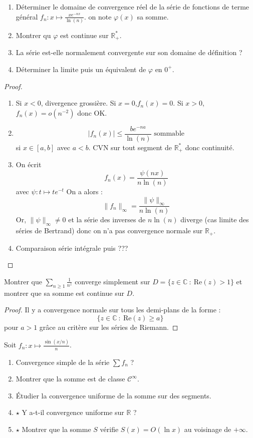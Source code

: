 \documentclass[french,a4paper]{article}
\newcommand{\R}{\mathbb{R}}
\newcommand{\C}{\mathbb{C}}
\newcommand{\st}{^*}
\theoremstyle{plain}
\theoremstyle{definition}
\theoremstyle{remark}
\begin{document}
\begin{ex}{}
	\begin{enumerate}
		\item Déterminer le domaine de convergence réel de la série de fonctions de terme général $f_n:x\mapsto\displaystyle\frac{xe^{-nx}}{\ln(n)}$. on note $\varphi(x)$ sa somme.
		\item Montrer qu $\varphi$ est continue sur $\R_+\st$.
		\item La série est-elle normalement convergente sur son domaine de définition ?
		\item Déterminer la limite puis un équivalent de $\varphi$ en $0^+$.
	\end{enumerate}
\end{ex}
\begin{proof}
	\begin{enumerate}
		\item Si $x<0$, divergence grossière. Si $x=0$,$f_n(x)=0$. Si $x>0$, $f_n(x)=o(n^{-2})$ donc OK.
		\item $$\lvert f_n(x)\rvert\leqslant \frac{be^{-na}}{\ln(n)}\text{ sommable}$$ si $x\in[a,b]$ avec $a<b$. CVN sur tout segment de $\R_+\st$ donc continuité.
		\item On écrit $$f_n(x)=\frac{\psi(nx)}{n\ln(n)}$$ avec $\psi:t\mapsto te^{-t}$ On a alors : $$\lVert f_n\rVert_\infty=\frac{\lVert\psi\rVert_\infty}{n\ln(n)}$$ Or, $\lVert\psi\rVert_\infty\ne0$ et la série des inverses de $n\ln(n)$ diverge (cas limite des séries de Bertrand) donc on n'a pas convergence normale sur $\R_+$.
		\item Comparaison série intégrale puis ???
	\end{enumerate}
\end{proof}

\begin{ex}{}
	Montrer que $\displaystyle\sum_{n\geqslant 1}\frac{1}{n^z}$ converge simplement sur $D=\{z\in\C\ : \ \text{Re}(z)>1\}$ et montrer que sa somme est continue sur $D$.
\end{ex}
\begin{proof}
	Il y a convergence normale sur tous les demi-plans de la forme : $$\{z\in\C\ : \ \text{Re}(z)\geqslant a\}$$ pour $a>1$ grâce au critère sur les séries de Riemann.
\end{proof}

\begin{ex}{}
	Soit $f_n:x\mapsto\displaystyle\frac{\sin(x/n)}{n}$.
	\begin{enumerate}
		\item Convergence simple de la série $\sum f_n$ ?
		\item Montrer que la somme est de classe $\mathcal{C}^\infty$.
		\item Étudier la convergence uniforme de la somme sur des segments.
		\item $\star$ Y a-t-il convergence uniforme sur $\R$ ?
		\item $\star$ Montrer que la somme $S$ vérifie $S(x)=O(\ln x)$ au voisinage de $+\infty$.
	\end{enumerate}
\end{ex}
\end{document}
